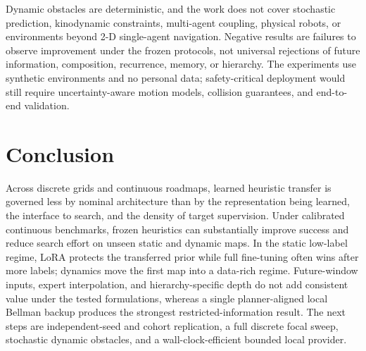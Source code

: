 \documentclass[letterpaper]{article} %
\begin{document}
Dynamic obstacles are deterministic, and the work does not cover stochastic prediction, kinodynamic constraints, multi-agent coupling, physical robots, or environments beyond 2-D single-agent navigation. Negative results are failures to observe improvement under the frozen protocols, not universal rejections of future information, composition, recurrence, memory, or hierarchy. The experiments use synthetic environments and no personal data; safety-critical deployment would still require uncertainty-aware motion models, collision guarantees, and end-to-end validation.

\section{Conclusion}

Across discrete grids and continuous roadmaps, learned heuristic transfer is governed less by nominal architecture than by the representation being learned, the interface to search, and the density of target supervision. Under calibrated continuous benchmarks, frozen heuristics can substantially improve success and reduce search effort on unseen static and dynamic maps. In the static low-label regime, LoRA protects the transferred prior while full fine-tuning often wins after more labels; dynamics move the first map into a data-rich regime. Future-window inputs, expert interpolation, and hierarchy-specific depth do not add consistent value under the tested formulations, whereas a single planner-aligned local Bellman backup produces the strongest restricted-information result. The next steps are independent-seed and cohort replication, a full discrete focal sweep, stochastic dynamic obstacles, and a wall-clock-efficient bounded local provider.



\end{document}
